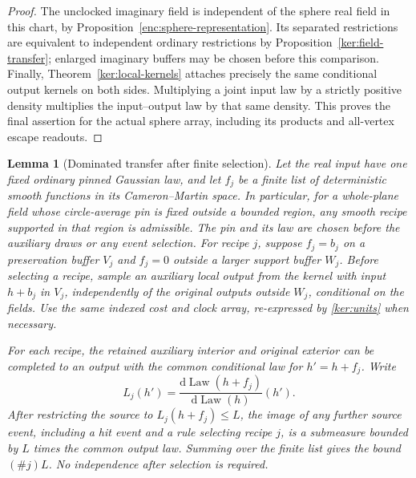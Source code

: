 \documentclass[11pt]{article}
\numberwithin{equation}{section}
\newtheorem{lemma}[theorem]{Lemma}
\theoremstyle{definition}
\theoremstyle{remark}
\newcommand{\1}{\mathbf 1}
\begin{document}
\begin{proof}
The unclocked imaginary field is independent of the sphere real
field in this chart, by Proposition~\ref{enc:sphere-representation}.
Its separated restrictions are equivalent to independent ordinary
restrictions by Proposition~\ref{ker:field-transfer}; enlarged
imaginary buffers may be chosen before this comparison.  Finally,
Theorem~\ref{ker:local-kernels} attaches precisely the same conditional
output kernels on both sides.  Multiplying a joint input law by a
strictly positive density multiplies the input--output law by that
same density.  This proves the final assertion for the actual sphere
array, including its products and all-vertex escape readouts.
\end{proof}

\begin{lemma}[Dominated transfer after finite selection]
\label{ker:selected-transfer}
Let the real input have one fixed ordinary pinned Gaussian law, and
let \(f_j\) be a finite list of deterministic smooth functions in its
Cameron--Martin space. In particular, for a whole-plane field whose
circle-average pin is fixed outside a bounded region, any smooth
recipe supported in that region is admissible. The pin and its law
are chosen before the auxiliary draws or any event selection.
For recipe \(j\), suppose \(f_j=b_j\) on a preservation buffer
\(V_j\) and \(f_j=0\) outside a larger support buffer \(W_j\).
Before selecting a recipe, sample an auxiliary local output from the
kernel with input \(h+b_j\) in \(V_j\), independently of the original
outputs outside \(W_j\), conditional on the fields.  Use the same
indexed cost and clock array, re-expressed by \eqref{ker:units} when
necessary.

For each recipe, the retained auxiliary interior and original exterior
can be completed to an output with the common conditional law for
\(h'=h+f_j\).  Write
\[
 L_j(h')=\frac{\mathrm d\operatorname{Law}(h+f_j)}{\mathrm d\operatorname{Law}(h)}(h').
\]
After restricting the source to \(L_j(h+f_j)\le L\), the image of
\emph{any} further source event, including a hit event and a rule
selecting recipe \(j\), is a submeasure bounded by \(L\) times the
common output law.  Summing over the finite list gives the bound
\((\#j)L\).  No independence after selection is required.
\end{lemma}
\end{document}
